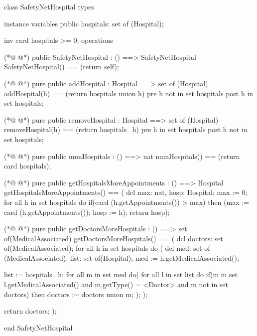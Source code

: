 \begin{vdmpp}[breaklines=true]
class SafetyNetHospital
types

instance variables
 public hospitals: set of (Hospital);
 
 inv card hospitals >= 0;
operations

(*@
\label{SafetyNetHospital:10}
@*)
 public SafetyNetHospital : () ==> SafetyNetHospital
  SafetyNetHospital() == (return self);
  
(*@
\label{addHospital:13}
@*)
 pure public addHospital : Hospital ==> set of (Hospital)
  addHospital(h) == (return hospitals union {h})
 pre h not in set hospitals
 post h in set hospitals;
 
(*@
\label{removeHospital:18}
@*)
 pure public removeHospital : Hospital ==> set of (Hospital)
  removeHospital(h) == (return hospitals \ {h})
 pre h in set hospitals
 post h not in set hospitals;
 
(*@
\label{numHospitals:23}
@*)
 pure public numHospitals : () ==> nat
  numHospitals() == (return card hospitals);
  
(*@
\label{getHospitalsMoreAppointments:26}
@*)
 pure public getHospitalsMoreAppointments : () ==> Hospital
  getHospitalsMoreAppointments() == (
                    dcl max: nat, hosp: Hospital;
                    max := 0;
                    for all h in set hospitals do
                     if(card (h.getAppointments()) > max)
                      then (max := card (h.getAppointments()); hosp := h);
                    return hosp);
 
(*@
\label{getDoctorsMoreHospitals:35}
@*)
 pure public getDoctorsMoreHospitals : () ==> set of(MedicalAssociated)
  getDoctorsMoreHospitals() == (
                  dcl doctors: set of(MedicalAssociated);
                  for all h in set hospitals do (
                   dcl med: set of (MedicalAssociated), list: set of(Hospital);
                   med := h.getMedicalAssociated();
                   
                   list := hospitals \ {h};
                   for all m in set med do(
                    for all l in set list do
                     if(m in set l.getMedicalAssociated() and m.getType() = <Doctor> and m not in set doctors)
                      then doctors := doctors union {m};
                   );
                  );
                  
                  return doctors;
                 );              
  
end SafetyNetHospital
\end{vdmpp}
